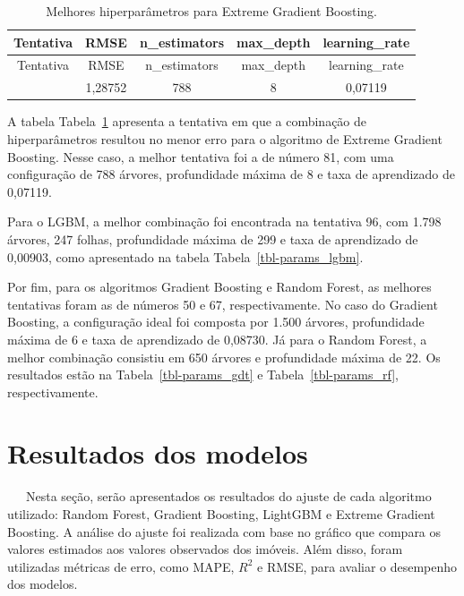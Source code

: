 \documentclass[
  12pt,
  a4paper,
]{scrreprt}
\begin{document}
\begin{longtable}[]{@{}ccccc@{}}
\caption{Melhores hiperparâmetros para Extreme Gradient
Boosting.}\label{tbl-params_xgb}\tabularnewline
\toprule\noalign{}
Tentativa & RMSE & n\_estimators & max\_depth & learning\_rate \\
\midrule\noalign{}
\endfirsthead
\toprule\noalign{}
Tentativa & RMSE & n\_estimators & max\_depth & learning\_rate \\
\midrule\noalign{}
\endhead
\bottomrule\noalign{}
\endlastfoot
81 & 1,28752 & 788 & 8 & 0,07119 \\
\end{longtable}

A tabela Tabela~\ref{tbl-params_xgb} apresenta a tentativa em que a
combinação de hiperparâmetros resultou no menor erro para o algoritmo de
Extreme Gradient Boosting. Nesse caso, a melhor tentativa foi a de
número 81, com uma configuração de 788 árvores, profundidade máxima de 8
e taxa de aprendizado de 0,07119.

\vspace{12pt}

Para o LGBM, a melhor combinação foi encontrada na tentativa 96, com
1.798 árvores, 247 folhas, profundidade máxima de 299 e taxa de
aprendizado de 0,00903, como apresentado na tabela
Tabela~\ref{tbl-params_lgbm}.

\vspace{12pt}

Por fim, para os algoritmos Gradient Boosting e Random Forest, as
melhores tentativas foram as de números 50 e 67, respectivamente. No
caso do Gradient Boosting, a configuração ideal foi composta por 1.500
árvores, profundidade máxima de 6 e taxa de aprendizado de 0,08730. Já
para o Random Forest, a melhor combinação consistiu em 650 árvores e
profundidade máxima de 22. Os resultados estão na
Tabela~\ref{tbl-params_gdt} e Tabela~\ref{tbl-params_rf},
respectivamente.

\section{Resultados dos modelos}\label{resultados-dos-modelos}

~~~Nesta seção, serão apresentados os resultados do ajuste de cada
algoritmo utilizado: Random Forest, Gradient Boosting, LightGBM e
Extreme Gradient Boosting. A análise do ajuste foi realizada com base no
gráfico que compara os valores estimados aos valores observados dos
imóveis. Além disso, foram utilizadas métricas de erro, como MAPE,
\(R^2\) e RMSE, para avaliar o desempenho dos modelos.
\end{document}
